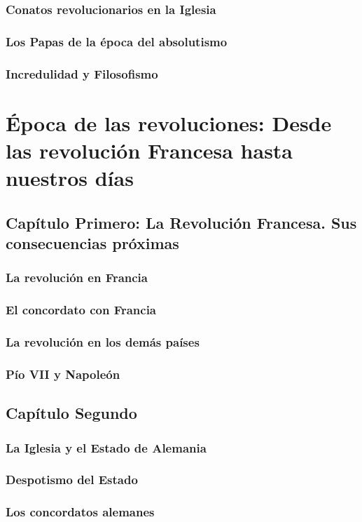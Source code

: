 \raggedbottom{} \documentclass[12pt]{book}
\begin{document}
\section{Conatos revolucionarios en la Iglesia}
\section{Los Papas de la época del absolutismo}
\section{Incredulidad y Filosofismo}
\part{Época de las revoluciones: Desde las revolución Francesa hasta nuestros días}
\chapter{Capítulo Primero: La Revolución Francesa. Sus consecuencias próximas}
\section{La revolución en Francia}
\section{El concordato con Francia}
\section{La revolución en los demás países}
\section{Pío VII y Napoleón}
\chapter{Capítulo Segundo}
\section{La Iglesia y el Estado de Alemania}
\section{Despotismo del Estado}
\section{Los concordatos alemanes}
\end{document}
